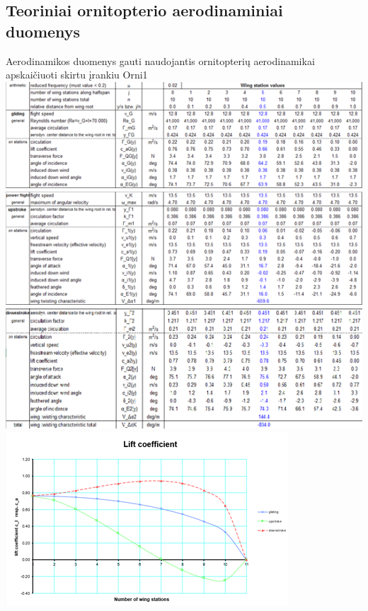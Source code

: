 \documentclass{VUMIFPSkursinis}
\begin{document}
\subsection{Teoriniai ornitopterio aerodinaminiai duomenys}
Aerodinamikos duomenys gauti naudojantis ornitopterių aerodinamikai apskaičiuoti skirtu įrankiu Orni1\\
\includegraphics[scale=0.9]{img/gliding}\\
\includegraphics[scale=0.9]{img/upstroke}\\
\includegraphics[scale=0.9]{img/downstroke}\\
\includegraphics[scale=0.9]{img/liftforce}\\
\end{document}
